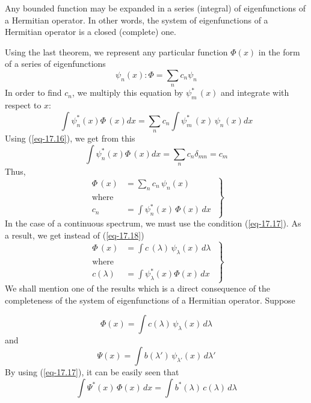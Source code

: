 \documentclass[a4paper,sfsidenotes,colorlinks=true]{tufte-book}
\numberwithin{equation}{section}
\numberwithin{figure}{section}
\begin{document}
\begin{description}[style=nextline, leftmargin=1cm, font=\rmfamily\bfseries]
  Any bounded function may be expanded in a series (integral) of
  eigenfunctions of a Hermitian operator. In other words, the system
  of eigenfunctions of a Hermitian operator is a closed (complete)
  one.

  Using the last theorem, we represent any particular function $\Phi (x)$
  in the form of a series of eigenfunctions 
\begin{equation*}%
\psi_{n} (x): \Phi = \sum_{n} c_{n} \psi_{n}
\end{equation*}
In  order to find $c_{n}$, we multiply this equation by
$\psi_{m}^{*}\, (x)$ and integrate with respect to $x$:
\begin{equation*}%
\int \psi_{n}^{*} (x) \Phi \, (x) dx = \sum_{n} c_{n} \int \psi_{m}^{*} \,(x) \, \psi_{n} (x) dx
\end{equation*}
Using (\ref{eq-17.16}), we get from this
\begin{equation*}%
\int \psi_{n}^{*} (x) \Phi \, (x) dx = \sum_{n} c_{n} \delta_{mn} = c_{m}
\end{equation*}
Thus,
\begin{equation}%
\left.
\begin{split}
\Phi \, (x) & = \sum_{n } c_{n} \, \psi_{n} (x) \\
\textrm{where} & \\
c_{n} & = \int \psi_{n}^{*} (x) \, \Phi(x) \, dx
\end{split}
\; \right\}
\label{eq-17.18}
\end{equation}
In the case of a continuous spectrum, we must use the condition
(\ref{eq-17.17}). As a result, we get instead of (\ref{eq-17.18})
\begin{equation}%
\left.
\begin{split}
\Phi \, (x) & = \int c \, (\lambda) \, \psi_{\lambda} (x) \, d \lambda\\
\textrm{where} & \\
c (\lambda) & = \int \psi_{\lambda}^{*} (x) \Phi(x) \, dx
\end{split}
\; \right\}
\label{eq-17.19}
\end{equation}
We shall mention one of the results which is a direct consequence of
the completeness of the system of eigenfunctions of a Hermitian
operator. Suppose 

\begin{equation*}
\Phi(x) = \int c (\lambda) \, \psi_{\lambda} (x) \, d \lambda
\end{equation*}
and 
\begin{equation*}
\Psi(x) = \int b (\lambda') \, \psi_{\lambda'} (x) \, d \lambda'
\end{equation*}
By using (\ref{eq-17.17}), it can be easily seen that 
\begin{equation}%
\int \Psi^{*} (x) \, \Phi (x) \, dx = \int b^{*} (\lambda) \,
c(\lambda) \, d \lambda
\label{eq-17.20}
\end{equation}
\end{description}
\end{document}
